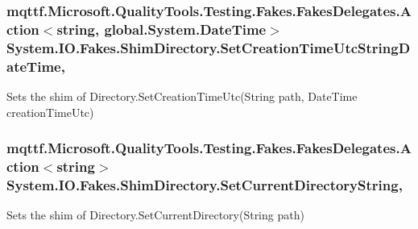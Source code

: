 \hypertarget{class_system_1_1_i_o_1_1_fakes_1_1_shim_directory_abf212e0627e8f027af59ca4d1cf7f540}{
\subsubsection[{Set\-Creation\-Time\-Utc\-String\-Date\-Time}]{\setlength{\rightskip}{0pt plus 5cm}mqttf.\-Microsoft.\-Quality\-Tools.\-Testing.\-Fakes.\-Fakes\-Delegates.\-Action$<$string, global.\-System.\-Date\-Time$>$ System.\-I\-O.\-Fakes.\-Shim\-Directory.\-Set\-Creation\-Time\-Utc\-String\-Date\-Time\hspace{0.3cm}{\ttfamily [static]}, {\ttfamily [set]}}}\label{class_system_1_1_i_o_1_1_fakes_1_1_shim_directory_abf212e0627e8f027af59ca4d1cf7f540}


Sets the shim of Directory.\-Set\-Creation\-Time\-Utc(\-String path, Date\-Time creation\-Time\-Utc)

\hypertarget{class_system_1_1_i_o_1_1_fakes_1_1_shim_directory_a584e6497450e9912b12f64e0a7bc229a}{
\subsubsection[{Set\-Current\-Directory\-String}]{\setlength{\rightskip}{0pt plus 5cm}mqttf.\-Microsoft.\-Quality\-Tools.\-Testing.\-Fakes.\-Fakes\-Delegates.\-Action$<$string$>$ System.\-I\-O.\-Fakes.\-Shim\-Directory.\-Set\-Current\-Directory\-String\hspace{0.3cm}{\ttfamily [static]}, {\ttfamily [set]}}}\label{class_system_1_1_i_o_1_1_fakes_1_1_shim_directory_a584e6497450e9912b12f64e0a7bc229a}


Sets the shim of Directory.\-Set\-Current\-Directory(\-String path)

